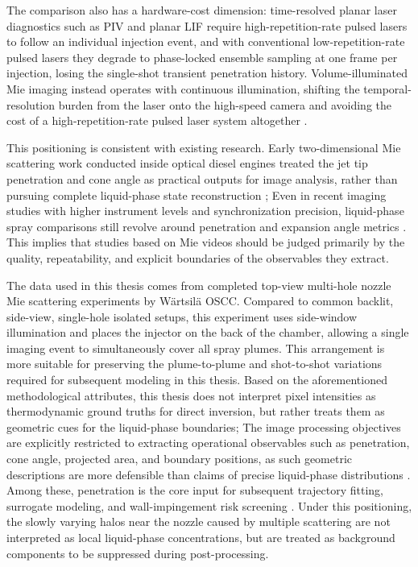 The comparison also has a hardware-cost dimension: time-resolved planar laser diagnostics such as PIV and planar LIF require high-repetition-rate pulsed lasers to follow an individual injection event, and with conventional low-repetition-rate pulsed lasers they degrade to phase-locked ensemble sampling at one frame per injection, losing the single-shot transient penetration history.
Volume-illuminated Mie imaging instead operates with continuous illumination, shifting the temporal-resolution burden from the laser onto the high-speed camera and avoiding the cost of a high-repetition-rate pulsed laser system altogether \cite{Linne2013SprayImaging}.

This positioning is consistent with existing research.
Early two-dimensional Mie scattering work conducted inside optical diesel engines treated the jet tip penetration and cone angle as practical outputs for image analysis, rather than pursuing complete liquid-phase state reconstruction \cite{MuenchLeipertz1992};
Even in recent imaging studies with higher instrument levels and synchronization precision, liquid-phase spray comparisons still revolve around penetration and expansion angle metrics \cite{JungManinSkeenPickett2015}.
This implies that studies based on Mie videos should be judged primarily by the quality, repeatability, and explicit boundaries of the observables they extract.

The data used in this thesis comes from completed top-view multi-hole nozzle Mie scattering experiments by Wärtsilä OSCC.
Compared to common backlit, side-view, single-hole isolated setups, this experiment uses side-window illumination and places the injector on the back of the chamber, allowing a single imaging event to simultaneously cover all spray plumes.
This arrangement is more suitable for preserving the plume-to-plume and shot-to-shot variations required for subsequent modeling in this thesis.
Based on the aforementioned methodological attributes, this thesis does not interpret pixel intensities as thermodynamic ground truths for direct inversion, but rather treats them as geometric cues for the liquid-phase boundaries;
The image processing objectives are explicitly restricted to extracting operational observables such as penetration, cone angle, projected area, and boundary positions, as such geometric descriptions are more defensible than claims of precise liquid-phase distributions \cite{Linne2013SprayImaging,LefebvreMcDonell2017}.
Among these, penetration is the core input for subsequent trajectory fitting, surrogate modeling, and wall-impingement risk screening \cite{Linne2013SprayImaging,LefebvreMcDonell2017,Dent1971Penetration,HiroyasuArai1990,NaberSiebers1996}.
Under this positioning, the slowly varying halos near the nozzle caused by multiple scattering are not interpreted as local liquid-phase concentrations, but are treated as background components to be suppressed during post-processing.

